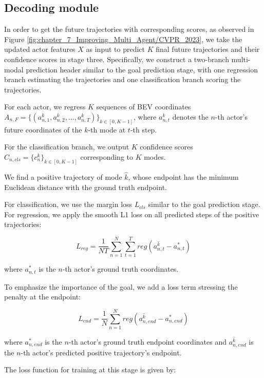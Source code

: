 \subsection{Decoding module}
\label{subsec:7_improving_efficiency_decoding_module}

In order to get the future trajectories with corresponding scores, as observed in Figure \ref{fig:chapter_7_Improving_Multi_Agent/CVPR_2023}, we take the updated actor features $X$ as input to predict $K$ final future trajectories and their confidence scores in stage three. 
Specifically, we construct a two-branch multi-modal prediction header similar to the goal prediction stage, with one regression branch estimating the trajectories and one classification branch scoring the trajectories.

For each actor, we regress $K$ sequences of BEV coordinates 
$A_{n,F}=\{(a_{n,1}^k,a_{n,2}^k,...,a_{n,T}^k)\}_{k \in [0,K-1]}$,
where $a_{n,t}^k$ denotes the $n$-th actor's future coordinates of the $k$-th mode at $t$-th step. 

For the classification branch, we output $K$ confidence scores $    C_{n,cls} = \{c_n^k\}_{k \in [0,K-1]}
$ corresponding to $K$ modes.

We find a positive trajectory of mode $\hat{k}$, whose endpoint has the minimum Euclidean distance with the ground truth endpoint.

For classification, we use the margin loss  $L_{cls}$ similar to the goal prediction stage. 
For regression, we apply the smooth L1 loss on all predicted steps of the positive trajectories:

\begin{equation}
	L_{reg}=\frac{1}{NT}\sum_{n=1}^N\sum_{t=1}^T{reg(a_{n,t}^{\hat{k}}-a^{*}_{n,t})}
\end{equation}

where $a^{*}_{n,t}$ is the $n$-th actor's ground truth coordinates.

To emphasize the importance of the goal, we add a loss term stressing the penalty at the endpoint:

\begin{equation}
	L_{end}=\frac{1}{N}\sum_{n=1}^N{reg(a_{n,end}^{\hat{k}}-a^{*}_{n,end})}
\end{equation}

where $a^{*}_{n,end}$ is the $n$-th actor's ground truth endpoint coordinates and $a_{n,end}^{\hat{k}}$ is the $n$-th actor's predicted positive trajectory's endpoint.

The loss function for training at this stage is given by:

